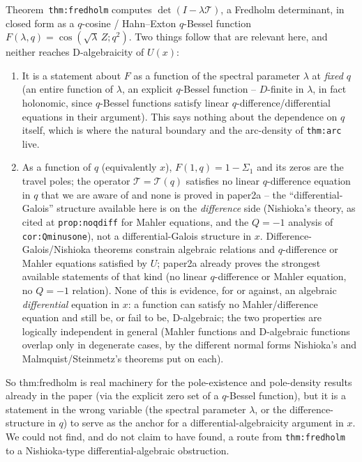 \documentclass[11pt]{article}
\theoremstyle{remark}
\begin{document}
Theorem~\texttt{thm:fredholm} computes $\det(I-\lambda\mathcal T)$, a Fredholm determinant, in closed
form as a $q$-cosine / Hahn--Exton $q$-Bessel function $F(\lambda,q)=\cos(\sqrt\lambda\,Z;q^2)$. Two
things follow that are relevant here, and neither reaches D-algebraicity of $U(x)$:
\begin{enumerate}
\item It is a statement about $F$ as a function of the spectral parameter $\lambda$ at \emph{fixed}
$q$ (an entire function of $\lambda$, an explicit $q$-Bessel function -- $D$-finite in $\lambda$, in
fact holonomic, since $q$-Bessel functions satisfy linear $q$-difference/differential equations in
their argument). This says nothing about the dependence on $q$ itself, which is where the natural
boundary and the arc-density of \texttt{thm:arc} live.
\item As a function of $q$ (equivalently $x$), $F(1,q)=1-\Sigma_1$ and its zeros are the travel
poles; the operator $\mathcal T=\mathcal T(q)$ satisfies no linear $q$-difference equation in $q$
that we are aware of and none is proved in paper2a -- the ``differential-Galois'' structure available
here is on the \emph{difference} side (Nishioka's theory, as cited at \texttt{prop:noqdiff} for
Mahler equations, and the $Q=-1$ analysis of \texttt{cor:Qminusone}), not a differential-Galois
structure in $x$. Difference-Galois/Nishioka theorems constrain algebraic relations and
$q$-difference or Mahler equations satisfied by $U$; paper2a already proves the strongest available
statements of that kind (no linear $q$-difference or Mahler equation, no $Q=-1$ relation). None of
this is evidence, for or against, an algebraic \emph{differential} equation in $x$: a function can
satisfy no Mahler/difference equation and still be, or fail to be, D-algebraic; the two properties
are logically independent in general (Mahler functions and D-algebraic functions overlap only in
degenerate cases, by the different normal forms Nishioka's and Malmquist/Steinmetz's theorems put on
each).
\end{enumerate}
So thm:fredholm is real machinery for the pole-existence and pole-density results already in the
paper (via the explicit zero set of a $q$-Bessel function), but it is a statement in the wrong
variable (the spectral parameter $\lambda$, or the difference-structure in $q$) to serve as the
anchor for a differential-algebraicity argument in $x$. We could not find, and do not claim to have
found, a route from \texttt{thm:fredholm} to a Nishioka-type differential-algebraic obstruction.
\end{document}
